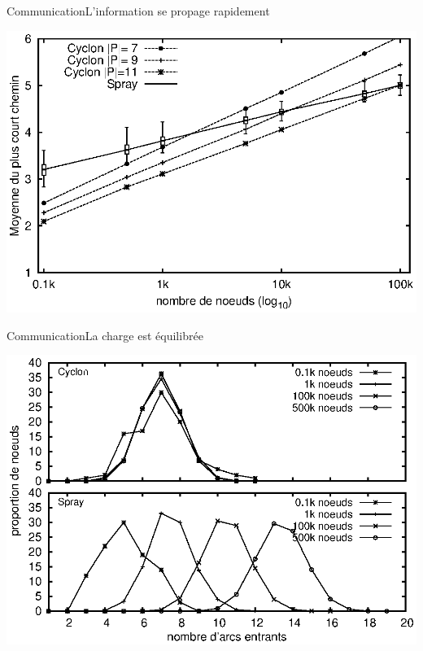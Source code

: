 \begin{frame}{Communication}{L'information se propage rapidement}
  \begin{center}
    \includegraphics[width=1\textwidth]{img/network/avgpath.eps}
  \end{center}
\end{frame}

\begin{frame}{Communication}{La charge est équilibrée}
  \begin{center}
    \includegraphics[width=1\textwidth]{img/network/histo.eps}
  \end{center}
\end{frame}


